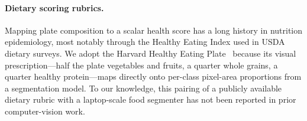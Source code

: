 \paragraph{Dietary scoring rubrics.}
Mapping plate composition to a scalar health score has a long history in nutrition epidemiology, most notably through the Healthy Eating Index used in USDA dietary surveys.
We adopt the Harvard Healthy Eating Plate~\cite{harvardplate} because its visual prescription---half the plate vegetables and fruits, a quarter whole grains, a quarter healthy protein---maps directly onto per-class pixel-area proportions from a segmentation model.
To our knowledge, this pairing of a publicly available dietary rubric with a laptop-scale food segmenter has not been reported in prior computer-vision work.
